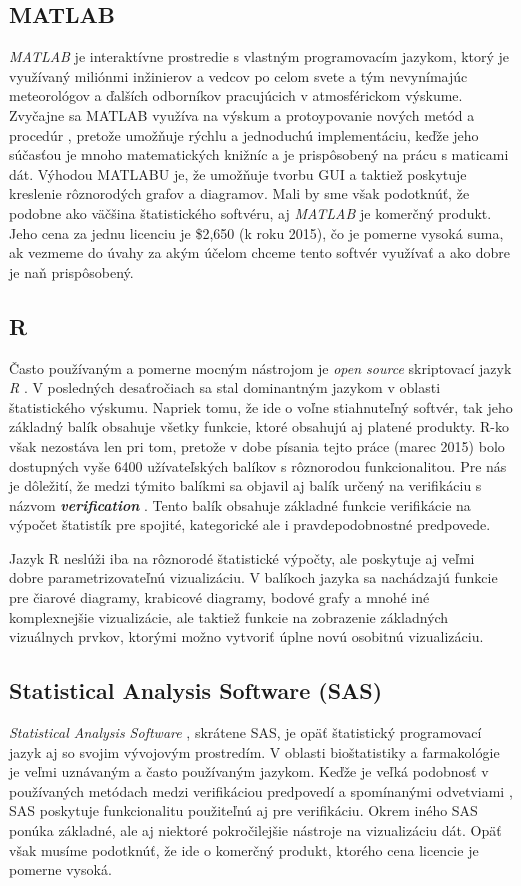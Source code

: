 \subsection{MATLAB}
\textit{MATLAB} je interaktívne prostredie s vlastným programovacím jazykom, ktorý je využívaný miliónmi inžinierov a vedcov po celom svete \cite{Matlab} a tým nevynímajúc meteorológov a ďalších odborníkov pracujúcich v atmosférickom výskume. 
Zvyčajne sa MATLAB využíva na výskum a protoypovanie nových metód a procedúr \cite{VerifSoft}, pretože umožňuje rýchlu a jednoduchú implementáciu, keďže jeho súčasťou je mnoho matematických knižníc a je prispôsobený na prácu s maticami dát.
Výhodou MATLABU je, že umožňuje tvorbu GUI a taktiež poskytuje kreslenie rôznorodých grafov a diagramov.
Mali by sme však podotknúť, že podobne ako väčšina štatistického softvéru, aj \textit{MATLAB} je komerčný produkt. Jeho cena za jednu licenciu je \$2,650 (k roku 2015), čo je pomerne vysoká suma, ak vezmeme do úvahy za akým účelom chceme tento softvér využívať a ako dobre je naň prispôsobený.

\subsection{R}
Často používaným a pomerne mocným nástrojom je \textit{open source} skriptovací jazyk \textit{R} \cite{RProject}. V posledných desaťročiach sa stal dominantným jazykom v oblasti štatistického výskumu. Napriek tomu, že ide o voľne stiahnuteľný softvér, tak jeho základný balík obsahuje všetky funkcie, ktoré obsahujú aj platené produkty. R-ko však nezostáva len pri tom, pretože v dobe písania tejto práce (marec 2015) bolo dostupných vyše 6400 užívateľských balíkov s rôznorodou funkcionalitou. Pre nás je dôležití, že medzi týmito balíkmi sa objavil aj balík určený na verifikáciu s názvom \textit{\textbf{verification}} \cite{VerifPackage}. Tento balík obsahuje základné funkcie verifikácie na výpočet štatistík pre spojité, kategorické ale i pravdepodobnostné predpovede. 

Jazyk R neslúži iba na rôznorodé štatistické výpočty, ale poskytuje aj veľmi dobre parametrizovateľnú vizualizáciu. V balíkoch jazyka sa nachádzajú funkcie pre čiarové diagramy, krabicové diagramy, bodové grafy a mnohé iné komplexnejšie vizualizácie, ale taktiež funkcie na zobrazenie základných vizuálnych prvkov, ktorými možno vytvoriť úplne novú osobitnú vizualizáciu.

\subsection[SAS]{Statistical Analysis Software (SAS)}
\textit{Statistical Analysis Software} \cite{SAS}, skrátene SAS, je opäť štatistický programovací jazyk aj so svojim vývojovým prostredím. V oblasti bioštatistiky a farmakológie je veľmi uznávaným a často používaným jazykom. Keďže je veľká podobnosť v používaných metódach medzi verifikáciou predpovedí a spomínanými odvetviami \cite{VerifSoft}, SAS poskytuje funkcionalitu použiteľnú aj pre verifikáciu. Okrem iného SAS ponúka základné, ale aj niektoré pokročilejšie nástroje na vizualizáciu dát. Opäť však musíme podotknúť, že ide o komerčný produkt, ktorého cena licencie je pomerne vysoká.

